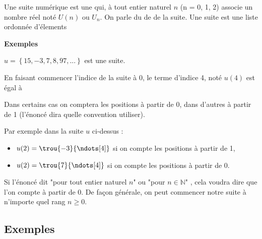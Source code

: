\documentclass[a4paper,12pt]{article}
\begin{document}
\begin{tcolorbox}[colback=green!10!white, colframe=green!75!black, title=Définition d'une suite]
  Une suite numérique est une \trou{\textcolor{blue}{fonction}}{\ndots[10]} qui, à tout entier naturel $n$ (n = 0, 1, 2) associe un nombre réel noté $U(n)$ ou $U_n$.
  On parle du \trou{\textcolor{blue}{terme}}{\ndots[10]} de \trou{\textcolor{blue}{rang / d'indice $n$}}{\ndots[10]} de la suite.  Une suite est une liste ordonnée d'élements
\end{tcolorbox}

\textbf{Exemples} \par
\vspace{0.5em}
$u = \left\{15, -3, 7, 8, 97, ...\right\}$ est une suite. \par 
En faisant commencer l'indice de la suite à 0, le terme d'indice 4, noté $u(4)$ est égal à \trou{\textcolor{blue}{8}}{\ndots[3]} \par 
\trou{\[
u(4) = 8
\]}{\vspace{2em}}

\vspace{1em}

Dans certains cas on comptera les positions à partir de 0, dans d'autres à partir de 1 (l'énoncé dira quelle convention utiliser). \par
\vspace{1em}
Par exemple dans la suite $u$ ci-dessus :
\begin{itemize}[noitemsep]
  \item $u(2)= \trou{-3}{\ndots[4]}$ si on compte les positions à partir de 1,
  \item $u(2)= \trou{7}{\ndots[4]}$ si on compte les positions à partir de 0.
\end{itemize}

Si l'énoncé dit "pour tout entier naturel $n$" ou "pour $n \in \mathbb{N}$" , cela voudra dire que l'on compte à partir de 0.
De façon générale, on peut commencer notre suite à n'importe quel rang $n \geq 0$.

\subsection*{Exemples}
\end{document}
